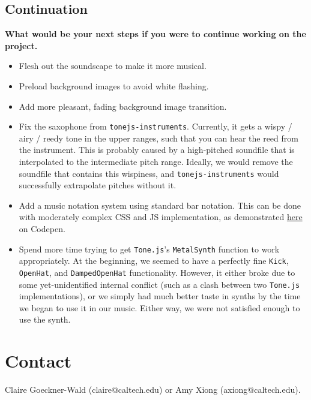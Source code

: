 \documentclass[12pt,a4paper]{article}
\newcommand{\code}{\texttt}
\newcommand{\lightcode}[1]{\colorbox{light-gray}{\texttt{#1}}}
\begin{document}
\subsection{Continuation}
\textbf{What would be your next steps if you were to continue working on the project.}
\begin{itemize}
	\item Flesh out the soundscape to make it more musical.
	\item Preload background images to avoid white flashing.
	\item Add more pleasant, fading background image transition.
	\item Fix the saxophone from \lightcode{tonejs-instruments}. Currently, it gets a wispy / airy / reedy tone in the upper ranges, such that you can hear the reed from the instrument. This is probably caused by a high-pitched soundfile that is interpolated to the intermediate pitch range. Ideally, we would remove the soundfile that contains this wispiness, and \lightcode{tonejs-instruments} would successfully extrapolate pitches without it.
	\item Add a music notation system using standard bar notation. This can be done with moderately complex CSS and JS implementation, as demonstrated \href{https://codepen.io/laviperchik/pen/mIACq}{here} on Codepen. \cite{css-musical-notes}
	\item Spend more time trying to get \lightcode{Tone.js}'s \code{MetalSynth} function to work appropriately. At the beginning, we seemed to have a perfectly fine \code{Kick}, \code{OpenHat}, and \code{DampedOpenHat} functionality. However, it either broke due to some yet-unidentified internal conflict (such as a clash between two \lightcode{Tone.js} implementations), or we simply had much better taste in synths by the time we began to use it in our music. Either way, we were not satisfied enough to use the synth.
\end{itemize}

\section{Contact}

Claire Goeckner-Wald (claire@caltech.edu) or Amy Xiong (axiong@caltech.edu).

\end{document}
